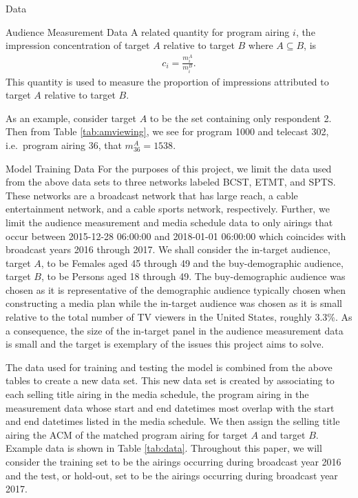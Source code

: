 \begin{chapter}{Data}
\begin{section}{Audience Measurement Data}
  A related quantity for program airing $i$, the impression concentration of target $A$ relative to target $B$ where $A \subseteq B$, is
  \begin{align*}
    c_i = \frac{m_{i}^A}{m_{i}^B}.
  \end{align*}
  This quantity is used to measure the proportion of impressions attributed to target $A$ relative to target $B$.

  As an example, consider target $A$ to be the set containing only respondent 2. Then
  from Table \ref{tab:amviewing}, we see for program 1000 and telecast 302, i.e.\ program airing 36, that $m_{36}^A = 1538$.
\end{section}

\begin{section}{Model Training Data}\label{data:used}
  For the purposes of this project, we limit the data used from the above data sets
  to three networks labeled BCST, ETMT, and SPTS. These networks are a broadcast network
  that has large reach, a cable entertainment network, and a cable sports network, respectively.
  Further, we limit the audience measurement and media schedule data to only airings that occur
  between 2015-12-28 06:00:00 and 2018-01-01 06:00:00 which coincides with broadcast years 2016 through 2017.
  We shall consider the in-target audience, target $A$, to be Females aged 45 through 49 and the buy-demographic audience, target $B$,
  to be Persons aged 18 through 49. The buy-demographic audience was chosen as it is representative
  of the demographic audience typically chosen when constructing a media plan while the in-target
  audience was chosen as it is small relative to the total number of TV viewers in the United States, roughly 3.3\%.
  As a consequence, the size of the in-target panel in the audience measurement data is small and the target is
  exemplary of the issues this project aims to solve.

  The data used for training and testing the model is combined from the above tables to create a new data set.
  This new data set is created by associating to each selling title airing in the media schedule, the
  program airing in the measurement data whose start and end datetimes most overlap with
  the start and end datetimes listed in the media schedule.
  We then assign
  the selling title airing the ACM of the matched program airing for target $A$ and target $B$.
  Example data is shown in Table \ref{tab:data}. Throughout this paper, we will consider the training set
  to be the airings occurring during broadcast year 2016 and the test, or hold-out, set to
  be the airings occurring during broadcast year 2017.


\end{section}
\end{chapter}
